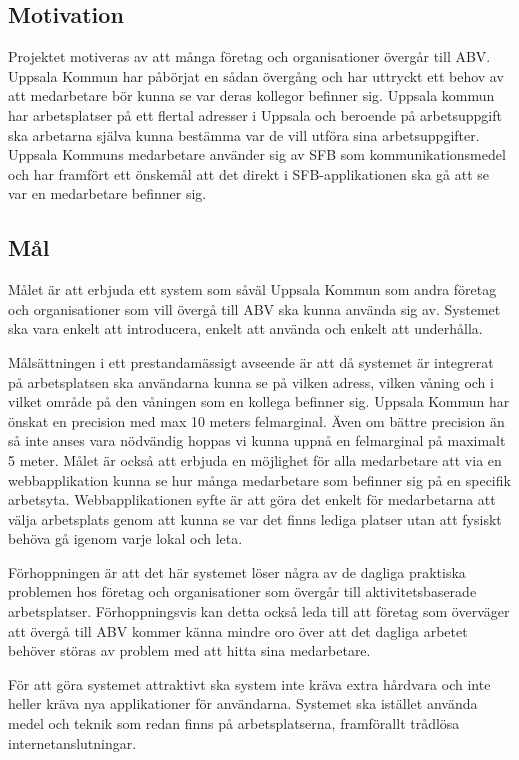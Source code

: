 \documentclass[swedish, a4paper,12pt]{article}
\begin{document}
\subsection{Motivation}
Projektet motiveras av att många företag och organisationer övergår till ABV. Uppsala Kommun har påbörjat en sådan övergång och har uttryckt ett behov av att medarbetare bör kunna se var deras kollegor befinner sig. Uppsala kommun har arbetsplatser på ett flertal adresser i Uppsala och beroende på arbetsuppgift ska arbetarna själva kunna bestämma var de vill utföra sina arbetsuppgifter. Uppsala Kommuns medarbetare använder sig av SFB som kommunikationsmedel och har framfört ett önskemål att det direkt i SFB-applikationen ska gå att se var en medarbetare befinner sig.

\subsection{Mål}\label{mal}
Målet är att erbjuda ett system som såväl Uppsala Kommun som andra företag och organisationer som vill övergå till ABV ska kunna använda sig av. Systemet ska vara enkelt att introducera, enkelt att använda och enkelt att underhålla.

Målsättningen i ett prestandamässigt avseende är att då systemet är integrerat på arbetsplatsen ska användarna kunna se på vilken adress, vilken våning och i vilket område på den våningen som en kollega befinner sig. Uppsala Kommun har önskat en precision med max 10 meters felmarginal. Även om bättre precision än så inte anses vara nödvändig hoppas vi kunna uppnå en felmarginal på maximalt 5 meter. Målet är också att erbjuda en möjlighet för alla medarbetare att via en webbapplikation kunna se hur många medarbetare som befinner sig på en specifik arbetsyta. Webbapplikationen syfte är att göra det enkelt för medarbetarna att välja arbetsplats genom att kunna se var det finns lediga platser utan att fysiskt behöva gå igenom varje lokal och leta.

Förhoppningen är att det här systemet löser några av de dagliga praktiska problemen hos företag och organisationer som övergår till aktivitetsbaserade arbetsplatser. Förhoppningsvis kan detta också leda till att företag som överväger att övergå till ABV kommer känna mindre oro över att det dagliga arbetet behöver störas av problem med att hitta sina medarbetare.

För att göra systemet attraktivt ska system inte kräva extra hårdvara och inte heller kräva nya applikationer för användarna. Systemet ska istället använda medel och teknik som redan finns på arbetsplatserna, framförallt trådlösa internetanslutningar.
\end{document}
